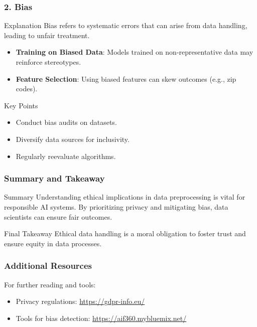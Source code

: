 \documentclass[aspectratio=169]{beamer}
\begin{document}
\begin{frame}[fragile]
    \frametitle{2. Bias}
    \begin{block}{Explanation}
        Bias refers to systematic errors that can arise from data handling, leading to unfair treatment.
    \end{block}
    \begin{itemize}
        \item \textbf{Training on Biased Data}: Models trained on non-representative data may reinforce stereotypes.
        \item \textbf{Feature Selection}: Using biased features can skew outcomes (e.g., zip codes).
    \end{itemize}
    \begin{block}{Key Points}
        \begin{itemize}
            \item Conduct bias audits on datasets.
            \item Diversify data sources for inclusivity.
            \item Regularly reevaluate algorithms.
        \end{itemize}
    \end{block}
\end{frame}

\begin{frame}[fragile]
    \frametitle{Summary and Takeaway}
    \begin{block}{Summary}
        Understanding ethical implications in data preprocessing is vital for responsible AI systems.
        By prioritizing privacy and mitigating bias, data scientists can ensure fair outcomes.
    \end{block}
    \begin{block}{Final Takeaway}
        Ethical data handling is a moral obligation to foster trust and ensure equity in data processes.
    \end{block}
\end{frame}

\begin{frame}[fragile]
    \frametitle{Additional Resources}
    For further reading and tools:
    \begin{itemize}
        \item Privacy regulations: \url{https://gdpr-info.eu/}
        \item Tools for bias detection: \url{https://aif360.mybluemix.net/}
    \end{itemize}
\end{frame}
\end{document}

